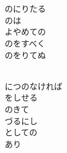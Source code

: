 \documentclass[10pt,b5j]{tarticle} %
\begin{document}
\vspace{1.5em} %
\newcommand{\linespace}{0.5em} %
\newcommand{\blocksize}{0.5\hsize} %
\newcommand{\itemmargin}{3em} %
\begin{enumerate} %
    \setlength{\itemindent}{\itemmargin} %
    \begin{minipage}[c]{\blocksize}
    
        \vspace{\linespace}
        \item~\\
        \\
        のにりたる\\
        のは\\
        よやめての\\
        のをすべく\\
        のをりてぬ
        
    \end{minipage}
    \begin{minipage}[c]{\blocksize}
        
        \vspace{\linespace}
        \item~\\
        につのなければ\\
        をしせる\\
        のきて\\
        づるにし\\
        としての\\
        あり
        
    \end{minipage}
    \begin{minipage}[c]{\blocksize}
        

\end{minipage}
\end{enumerate}
\end{document}
